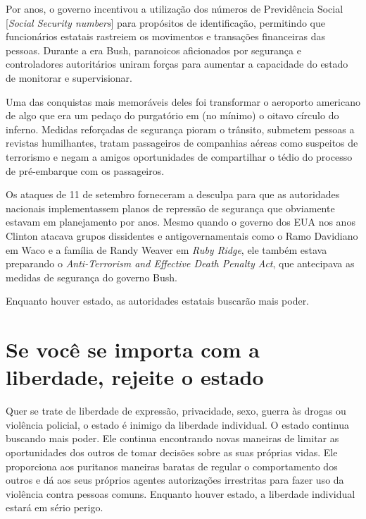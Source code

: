 Por anos, o governo incentivou a utilização dos números de Previdência Social [\emph{Social Security numbers}] para propósitos de identificação, permitindo que funcionários estatais rastreiem os movimentos e transações financeiras das pessoas. Durante a era Bush, paranoicos aficionados por segurança e controladores autoritários uniram forças para aumentar a capacidade do estado de monitorar e supervisionar.

Uma das conquistas mais memoráveis deles foi transformar o aeroporto americano de algo que era um pedaço do purgatório em (no mínimo) o oitavo círculo do inferno. Medidas reforçadas de segurança pioram o trânsito, submetem pessoas a revistas humilhantes, tratam passageiros de companhias aéreas como suspeitos de terrorismo e negam a amigos oportunidades de compartilhar o tédio do processo de pré-embarque com os passageiros.

Os ataques de 11 de setembro forneceram a desculpa para que as autoridades nacionais implementassem planos de repressão de segurança que obviamente estavam em planejamento por anos. Mesmo quando o governo dos EUA nos anos Clinton atacava grupos dissidentes e antigovernamentais como o Ramo Davidiano em Waco e a família de Randy Weaver em \emph{Ruby Ridge}, ele também estava preparando o \emph{Anti-Terrorism and Effective Death Penalty Act}, que antecipava as medidas de segurança do governo Bush.

Enquanto houver estado, as autoridades estatais buscarão mais poder.

\section{Se você se importa com a liberdade, rejeite o estado}

Quer se trate de liberdade de expressão, privacidade, sexo, guerra às drogas ou violência policial, o estado é inimigo da liberdade individual. O estado continua buscando mais poder. Ele continua encontrando novas maneiras de limitar as oportunidades dos outros de tomar decisões sobre as suas próprias vidas. Ele proporciona aos puritanos maneiras baratas de regular o comportamento dos outros e dá aos seus próprios agentes autorizações irrestritas para fazer uso da violência contra pessoas comuns. Enquanto houver estado, a liberdade individual estará em sério perigo.